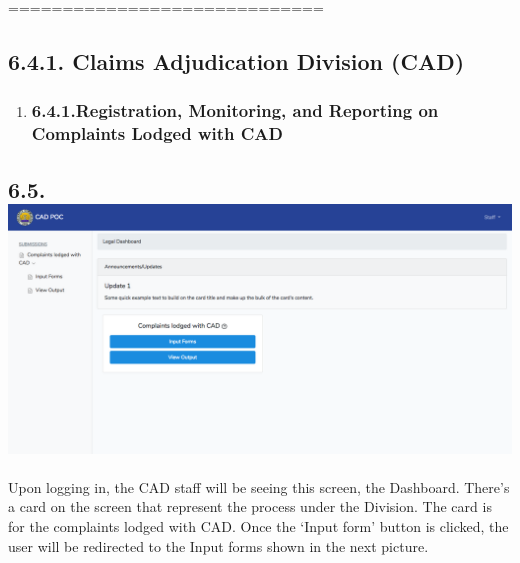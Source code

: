 \documentclass{article}
\begin{document}
\mdhr{}%

\noindent{}=============================%

\subsection{6.4.\hspace*{0.5em}1.  Claims Adjudication Division (CAD)}\label{sec-1-claims-adjudication-division-cad}%

\begin{enumerate}[noitemsep,topsep=\mdcompacttopsep]%

\item{}
\subsubsection{6.4.1.\hspace*{0.5em}Registration, Monitoring, and Reporting on Complaints Lodged with CAD}\label{sec-registration-monitoring-and-reporting-on-complaints-lodged-with-cad}%
\end{enumerate}%

\subsection{6.5.\hspace*{0.5em}\includegraphics[keepaspectratio=true]{up-ic-screens/image209}{}}\label{sec-up-ic-screensimage209png}%

\noindent{}Upon logging in, the CAD staff will be seeing this
screen, the Dashboard. There’s a card on the screen that represent the
process under the Division. The card is for the complaints lodged with CAD. Once
the ‘Input form’ button is clicked, the user will be redirected to the
Input forms shown in the next picture.%
\end{document}
